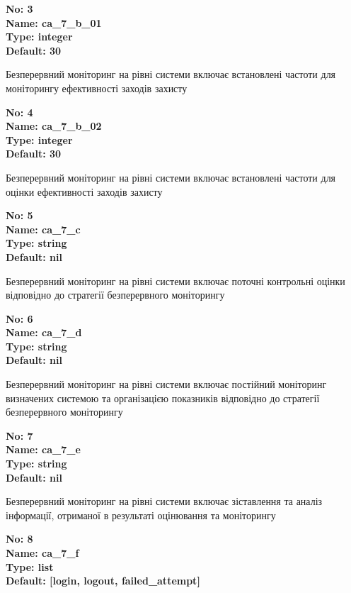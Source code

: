 \documentclass{article}
\begin{document}
{\footnotesize\bfseries
No: 3\\
Name: ca\_\allowbreak{}7\_\allowbreak{}b\_\allowbreak{}01\\
Type: integer\\
Default: 30
}

{\footnotesize Безперервний моніторинг на рівні системи включає встановлені частоти для моніторингу ефективності заходів захисту}


{\footnotesize\bfseries
No: 4\\
Name: ca\_\allowbreak{}7\_\allowbreak{}b\_\allowbreak{}02\\
Type: integer\\
Default: 30
}

{\footnotesize Безперервний моніторинг на рівні системи включає встановлені частоти для оцінки ефективності заходів захисту}


{\footnotesize\bfseries
No: 5\\
Name: ca\_\allowbreak{}7\_\allowbreak{}c\\
Type: string\\
Default: nil
}

{\footnotesize Безперервний моніторинг на рівні системи включає поточні контрольні оцінки відповідно до стратегії безперервного моніторингу}


{\footnotesize\bfseries
No: 6\\
Name: ca\_\allowbreak{}7\_\allowbreak{}d\\
Type: string\\
Default: nil
}

{\footnotesize Безперервний моніторинг на рівні системи включає постійний моніторинг визначених системою та організацією показників відповідно до стратегії безперервного моніторингу}


{\footnotesize\bfseries
No: 7\\
Name: ca\_\allowbreak{}7\_\allowbreak{}e\\
Type: string\\
Default: nil
}

{\footnotesize Безперервний моніторинг на рівні системи включає зіставлення та аналіз інформації, отриманої в результаті оцінювання та моніторингу}


{\footnotesize\bfseries
No: 8\\
Name: ca\_\allowbreak{}7\_\allowbreak{}f\\
Type: list\\
Default: [\textquotedbl{}login\textquotedbl{}, \textquotedbl{}logout\textquotedbl{}, \textquotedbl{}failed\_\allowbreak{}attempt\textquotedbl{}]
}
\end{document}
